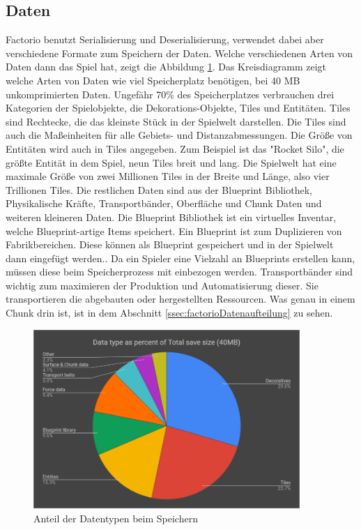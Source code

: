\subsection{Daten}
Factorio benutzt Serialisierung und Deserialisierung, verwendet dabei aber verschiedene Formate zum Speichern der Daten. Welche verschiedenen Arten von Daten dann das Spiel hat, zeigt die Abbildung \ref{fig:factorioSaveStatistic}. Das Kreisdiagramm zeigt welche Arten von Daten wie viel Speicherplatz benötigen, bei 40 MB unkomprimierten Daten. Ungefähr 70\% des Speicherplatzes verbrauchen drei Kategorien der Spielobjekte, die Dekorations-Objekte, Tiles und Entitäten. Tiles sind Rechtecke, die das kleinste Stück in der Spielwelt darstellen. Die Tiles sind auch die Maßeinheiten für alle Gebiets- und Distanzabmessungen. Die Größe von Entitäten wird auch in Tiles angegeben. Zum Beispiel ist das "Rocket Silo", die größte Entität in dem Spiel, neun Tiles breit und lang. Die Spielwelt hat eine maximale Größe von zwei Millionen Tiles in der Breite und Länge, also vier Trillionen Tiles.\cite{factorioMapStructure} Die restlichen Daten sind aus der Blueprint Bibliothek, Physikalische Kräfte, Transportbänder, Oberfläche und Chunk Daten und weiteren kleineren Daten.\cite{factorioFridayFacts270} Die Blueprint Bibliothek ist ein virtuelles Inventar, welche Blueprint-artige Items speichert.\cite{factorioBlueprintLibrary} Ein Blueprint ist zum Duplizieren von Fabrikbereichen. Diese können als Blueprint gespeichert und in der Spielwelt dann eingefügt werden.\cite{factorioBlueprint}. Da ein Spieler eine Vielzahl an Blueprints erstellen kann, müssen diese beim Speicherprozess mit einbezogen werden. Transportbänder sind wichtig zum maximieren der Produktion und Automatisierung dieser. Sie transportieren die abgebauten oder hergestellten Ressourcen. Was genau in einem Chunk drin ist, ist in dem Abschnitt \ref{ssec:factorioDatenaufteilung} zu sehen. 

\begin{figure}[htp]
    \centering
    \includegraphics[width=0.9\textwidth]{images/factorio_save_statistic.png}
    \caption{Anteil der Datentypen beim Speichern\cite{factorioFridayFacts270}}
    \label{fig:factorioSaveStatistic}
\end{figure}



